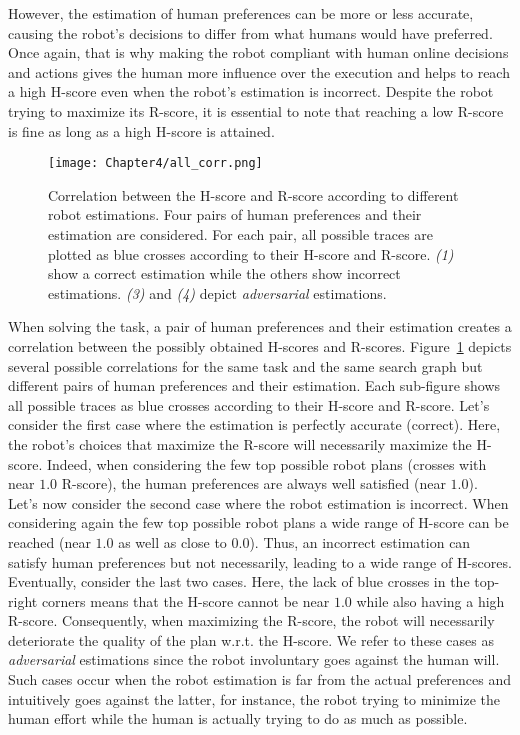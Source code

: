 However, the estimation of human preferences can be more or less accurate, causing the robot's decisions to differ from what humans would have preferred. Once again, that is why making the robot compliant with human online decisions and actions gives the human more influence over the execution and helps to reach a high H-score even when the robot's estimation is incorrect.
Despite the robot trying to maximize its R-score, it is essential to note that reaching a low R-score is fine as long as a high H-score is attained.

\begin{figure}
    \texttt{[image: Chapter4/all\_corr.png]}
    \caption{
    Correlation between the H-score and R-score according to different robot estimations. Four pairs of human preferences and their estimation are considered. For each pair, all possible traces are plotted as blue crosses according to their H-score and R-score. \textit{(1)} show a correct estimation while the others show incorrect estimations. \textit{(3)} and \textit{(4)} depict \textit{adversarial} estimations.
    }
    \label{fig:corr}
\end{figure}

When solving the task, a pair of human preferences and their estimation creates a correlation between the possibly obtained H-scores and R-scores. Figure~\ref{fig:corr} depicts several possible correlations for the same task and the same search graph but different pairs of human preferences and their estimation. Each sub-figure shows all possible traces as blue crosses according to their H-score and R-score. 
Let's consider the first case where the estimation is perfectly accurate (correct). Here, the robot's choices that maximize the R-score will necessarily maximize the H-score. Indeed, when considering the few top possible robot plans (crosses with near $1.0$ R-score), the human preferences are always well satisfied (near $1.0$). 
Let's now consider the second case where the robot estimation is incorrect. When considering again the few top possible robot plans a wide range of H-score can be reached (near $1.0$ as well as close to $0.0$). Thus, an incorrect estimation can satisfy human preferences but not necessarily, leading to a wide range of H-scores.
Eventually, consider the last two cases. Here, the lack of blue crosses in the top-right corners means that the H-score cannot be near $1.0$ while also having a high R-score. Consequently, when maximizing the R-score, the robot will necessarily deteriorate the quality of the plan w.r.t. the H-score. We refer to these cases as \textit{adversarial} estimations since the robot involuntary goes against the human will. Such cases occur when the robot estimation is far from the actual preferences and intuitively goes against the latter, for instance, the robot trying to minimize the human effort while the human is actually trying to do as much as possible.  

